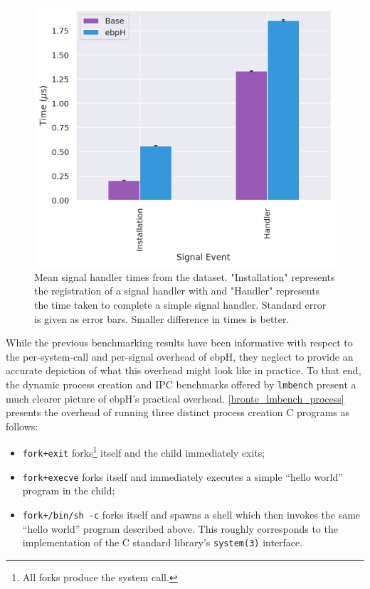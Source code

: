 \documentclass[
  12pt]{findlay}
\newcommand{\passthrough}[1]{#1}
\providecommand{\tightlist}{\setlength{\itemsep}{0pt}\setlength{\parskip}{0pt}}
\begin{document}
\begin{figure}
    \caption[Mean signal handler times from the  dataset]{
        Mean signal handler times from the  dataset.
        "Installation" represents the registration of a signal handler with  and
        "Handler" represents the time taken to complete a simple signal handler.
        Standard error is given as error bars.
        Smaller difference in times is better.
    }
    \label{bronte_lmbench_signal_graph}
    \includegraphics[width=.6\textwidth]{../data/bench/bronte-lmbench/signal_times.png}
\end{figure}

\FloatBarrier

While the previous benchmarking results have been informative with
respect to the per-system-call and per-signal overhead of ebpH, they
neglect to provide an accurate depiction of what this overhead might
look like in practice. To that end, the dynamic process creation and IPC
benchmarks offered by \passthrough{\lstinline!lmbench!} present a much
clearer picture of ebpH's practical overhead.
\autoref{bronte_lmbench_process} presents the overhead of running three
distinct process creation C programs as follows:

\begin{itemize}
\tightlist
\item
  \passthrough{\lstinline!fork+exit!}
  forks\footnote{All forks produce the  system call.}
  itself and the child immediately exits;
\item
  \passthrough{\lstinline!fork+execve!} forks itself and immediately
  executes a simple ``hello world'' program in the child;
\item
  \passthrough{\lstinline!fork+/bin/sh -c!} forks itself and spawns a
  shell which then invokes the same ``hello world'' program described
  above. This roughly corresponds to the implementation of the C
  standard library's \passthrough{\lstinline!system(3)!}
  \autocite{man_system} interface.
\end{itemize}
\end{document}
